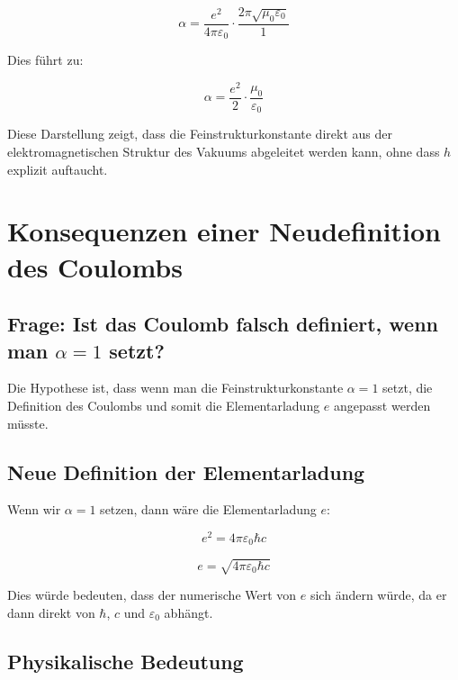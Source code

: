 \documentclass{article}
\begin{document}
	\begin{equation}
		\alpha = \frac{e^2}{4\pi\varepsilon_0} \cdot \frac{2\pi\sqrt{\mu_0\varepsilon_0}}{1}
	\end{equation}
	
	Dies führt zu:
	
	\begin{equation}
		\alpha = \frac{e^2}{2} \cdot \frac{\mu_0}{\varepsilon_0}
	\end{equation}
	
	Diese Darstellung zeigt, dass die Feinstrukturkonstante direkt aus der elektromagnetischen Struktur des Vakuums abgeleitet werden kann, ohne dass $h$ explizit auftaucht.
	
	\section{Konsequenzen einer Neudefinition des Coulombs}
	
	\subsection{Frage: Ist das Coulomb falsch definiert, wenn man $\alpha = 1$ setzt?}
	
	Die Hypothese ist, dass wenn man die Feinstrukturkonstante $\alpha = 1$ setzt, die Definition des Coulombs und somit die Elementarladung $e$ angepasst werden müsste.
	
	\subsection{Neue Definition der Elementarladung}
	
	Wenn wir $\alpha = 1$ setzen, dann wäre die Elementarladung $e$:
	
	\begin{equation}
		e^2 = 4\pi\varepsilon_0\hbar c
	\end{equation}
	
	\begin{equation}
		e = \sqrt{4\pi\varepsilon_0\hbar c}
	\end{equation}
	
	Dies würde bedeuten, dass der numerische Wert von $e$ sich ändern würde, da er dann direkt von $\hbar$, $c$ und $\varepsilon_0$ abhängt.
	
	\subsection{Physikalische Bedeutung}
	
\end{document}
